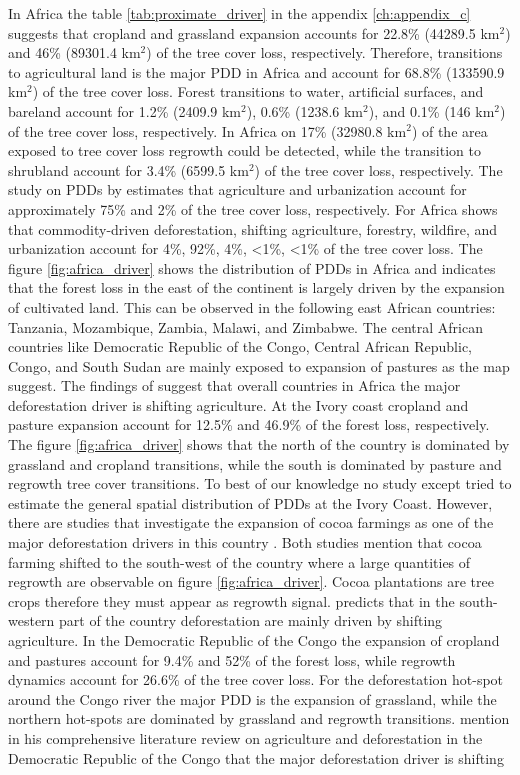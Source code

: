 			In Africa the table \ref{tab:proximate_driver} in the appendix \ref{ch:appendix_c} suggests that cropland and grassland expansion accounts for 22.8\% (44289.5 km$^2$) and 46\% (89301.4 km$^2$) of the tree cover loss, respectively. Therefore, transitions to agricultural land is the major \ac{PDD} in Africa and account for 68.8\% (133590.9 km$^2$) of the tree cover loss. Forest transitions to water, artificial surfaces, and bareland account for 1.2\% (2409.9 km$^2$), 0.6\% (1238.6 km$^2$), and 0.1\% (146 km$^2$) of the tree cover loss, respectively. In Africa on 17\% (32980.8 km$^2$) of the area exposed to tree cover loss regrowth could be detected, while the transition to shrubland account for 3.4\% (6599.5 km$^2$) of the tree cover loss, respectively. The study on \acp{PDD} by \citet{Hosonuma2012} estimates that agriculture and urbanization account for approximately 75\% and 2\% of the tree cover loss, respectively. For Africa \citet{Curtis2018} shows that commodity-driven deforestation, shifting agriculture, forestry, wildfire, and urbanization account for 4\%, 92\%, 4\%, <1\%, <1\% of the tree cover loss. The figure \ref{fig:africa_driver} shows the distribution of \acp{PDD} in Africa and indicates that the forest loss in the east of the continent is largely driven by the expansion of cultivated land. This can be observed in the following east African countries: Tanzania, Mozambique, Zambia, Malawi, and Zimbabwe. The central African countries like Democratic Republic of the Congo, Central African Republic, Congo, and South Sudan are mainly exposed to expansion of pastures as the map suggest. The findings of \citeauthor{Curtis2018} suggest that overall countries in Africa the major deforestation driver is shifting agriculture. At the Ivory coast cropland and pasture expansion account for 12.5\% and 46.9\% of the forest loss, respectively. The figure \ref{fig:africa_driver} shows that the north of the country is dominated by grassland and cropland transitions, while the south is dominated by pasture and regrowth tree cover transitions. To best of our knowledge no study except \citeauthor{Curtis2018} tried to estimate the general spatial distribution of \acp{PDD} at the Ivory Coast. However, there are studies that investigate the expansion of cocoa farmings as one of the major deforestation drivers in this country \citep{Barima2016,Ruf2014}. Both studies mention that cocoa farming shifted to the south-west of the country where a large quantities of regrowth are observable on figure \ref{fig:africa_driver}. Cocoa plantations are tree crops therefore they must appear as regrowth signal. \citet{Curtis2018} predicts that in the south-western part of the country deforestation are mainly driven by shifting agriculture. In the Democratic Republic of the Congo the expansion of cropland and pastures account for 9.4\% and 52\% of the forest loss, while regrowth dynamics account for 26.6\% of the tree cover loss. For the deforestation hot-spot around the Congo river the major \ac{PDD} is the expansion of grassland, while the northern hot-spots are dominated by grassland and regrowth transitions. \citet{Ickowitz2015} mention in his comprehensive literature review on agriculture and deforestation in the Democratic Republic of the Congo that the major deforestation driver is shifting 